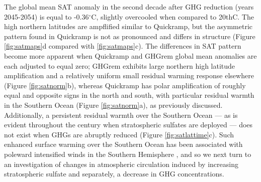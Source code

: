 \documentclass[grl]{AGUTeX}  %
\begin{document}
\begin{article}
The global mean SAT anomaly in the second decade after GHG reduction (years 2045-2054) is equal to -0.36$^\circ$C, slightly overcooled when compared to 20thC. The high northern latitudes are ampflified similar to Quickramp, but the asymmetric pattern found in Quickramp is not as pronounced and differs in structure (Figure \ref{fig:satmaps}d compared with \ref{fig:satmaps}c). The differences in SAT pattern become more apparent when Quickramp and GHGrem global mean anomalies are each adjusted to equal zero; GHGrem exhibits large northern high latitude amplification and a relatively uniform small residual warming response elsewhere (Figure \ref{fig:satnorm}b), whereas Quickramp has polar amplification of roughly equal and opposite signs in the north and south, with particular residual warmth in the Southern Ocean (Figure \ref{fig:satnorm}a), as previously discussed. Additionally, a persistent residual warmth over the Southern Ocean --- as is evident throughout the century when stratospheric sulfates are deployed --- does not exist when GHGs are abruptly reduced (Figure \ref{fig:satlattime}c). Such enhanced surface warming over the Southern Ocean has been associated with poleward intensified winds in the Southern Hemisphere \citep{fyfe07,bitz12b,sigmond10,smith12}, and so we next turn to an investigation of changes in atmospheric circulation induced by increasing stratospheric sulfate and separately, a decrease in GHG concentrations. %




\end{article}
\end{document}
